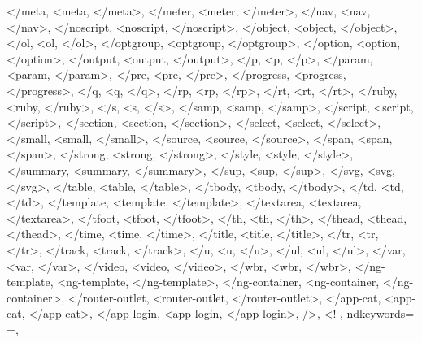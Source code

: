 {{            </meta, <meta, </meta>,
            </meter, <meter, </meter>,
            </nav, <nav, </nav>,
            </noscript, <noscript, </noscript>,
            </object, <object, </object>,
            </ol, <ol, </ol>,
            </optgroup, <optgroup, </optgroup>,
            </option, <option, </option>,
            </output, <output, </output>,
            </p, <p, </p>,
            </param, <param, </param>,
            </pre, <pre, </pre>,
            </progress, <progress, </progress>,
            </q, <q, </q>,
            </rp, <rp, </rp>,
            </rt, <rt, </rt>,
            </ruby, <ruby, </ruby>,
            </s, <s, </s>,
            </samp, <samp, </samp>,
            </script, <script, </script>,
            </section, <section, </section>,
            </select, <select, </select>,
            </small, <small, </small>,
            </source, <source, </source>,
            </span, <span, </span>,
            </strong, <strong, </strong>,
            </style, <style, </style>,
            </summary, <summary, </summary>,
            </sup, <sup, </sup>,
            </svg, <svg, </svg>,
            </table, <table, </table>,
            </tbody, <tbody, </tbody>,
            </td, <td, </td>,
            </template, <template, </template>,
            </textarea, <textarea, </textarea>,
            </tfoot, <tfoot, </tfoot>,
            </th, <th, </th>,
            </thead, <thead, </thead>,
            </time, <time, </time>,
            </title, <title, </title>,
            </tr, <tr, </tr>,
            </track, <track, </track>,
            </u, <u, </u>,
            </ul, <ul, </ul>,
            </var, <var, </var>,
            </video, <video, </video>,
            </wbr, <wbr, </wbr>,
            </ng-template, <ng-template, </ng-template>,
            </ng-container, <ng-container, </ng-container>,
            </router-outlet, <router-outlet, </router-outlet>,
            </app-cat, <app-cat, </app-cat>,
            </app-login, <app-login, </app-login>,
            />, <!
            },  
            ndkeywords={
            =,
}}
